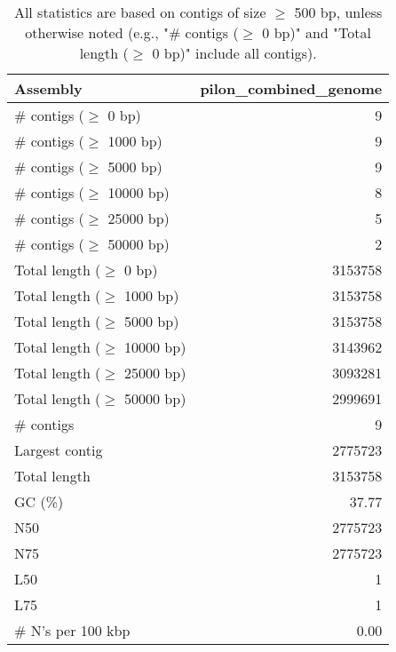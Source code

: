 \documentclass[12pt,a4paper]{article}
\begin{document}
\begin{table}[ht]
\begin{center}
\caption{All statistics are based on contigs of size $\geq$ 500 bp, unless otherwise noted (e.g., "\# contigs ($\geq$ 0 bp)" and "Total length ($\geq$ 0 bp)" include all contigs).}
\begin{tabular}{|l*{1}{|r}|}
\hline
Assembly & pilon\_combined\_genome \\ \hline
\# contigs ($\geq$ 0 bp) & 9 \\ \hline
\# contigs ($\geq$ 1000 bp) & 9 \\ \hline
\# contigs ($\geq$ 5000 bp) & 9 \\ \hline
\# contigs ($\geq$ 10000 bp) & 8 \\ \hline
\# contigs ($\geq$ 25000 bp) & 5 \\ \hline
\# contigs ($\geq$ 50000 bp) & 2 \\ \hline
Total length ($\geq$ 0 bp) & 3153758 \\ \hline
Total length ($\geq$ 1000 bp) & 3153758 \\ \hline
Total length ($\geq$ 5000 bp) & 3153758 \\ \hline
Total length ($\geq$ 10000 bp) & 3143962 \\ \hline
Total length ($\geq$ 25000 bp) & 3093281 \\ \hline
Total length ($\geq$ 50000 bp) & 2999691 \\ \hline
\# contigs & 9 \\ \hline
Largest contig & 2775723 \\ \hline
Total length & 3153758 \\ \hline
GC (\%) & 37.77 \\ \hline
N50 & 2775723 \\ \hline
N75 & 2775723 \\ \hline
L50 & 1 \\ \hline
L75 & 1 \\ \hline
\# N's per 100 kbp & 0.00 \\ \hline
\end{tabular}
\end{center}
\end{table}
\end{document}
